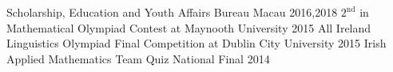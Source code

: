 


\begin{cvhonors}

  \cvhonor
    {Scholarship, Education and Youth Affairs Bureau Macau} %
    {} %
    {2016,2018} %
  \cvhonor
    {$2^{\text{nd}}$ in Mathematical Olympiad Contest at Maynooth University} %
    {} %
    {2015} %
  \cvhonor
    {All Ireland Linguistics Olympiad Final Competition at Dublin City University} %
    {} %
    {2015} %
  \cvhonor
    {Irish Applied Mathematics Team Quiz National Final} %
    {} %
    {2014} %
\end{cvhonors}